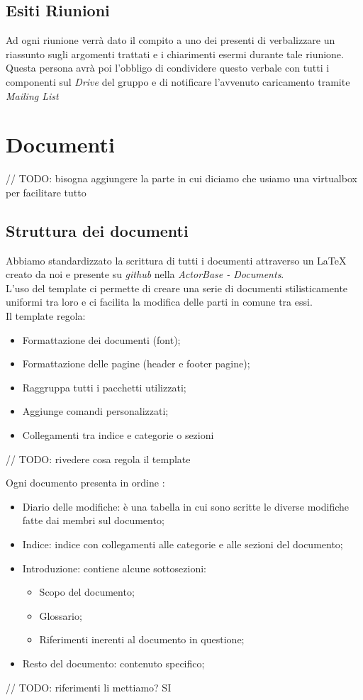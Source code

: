 \documentclass{scalatekids-article}
\begin{document}
\subsection{Esiti Riunioni}
Ad ogni riunione verrà dato il compito a uno dei presenti di verbalizzare un riassunto sugli argomenti trattati e i chiarimenti esermi durante tale riunione.\\
Questa persona avrà poi l'obbligo di condividere questo verbale con tutti i componenti sul \textit{Drive} del gruppo e di notificare l'avvenuto caricamento tramite \textit{Mailing List}

\section{Documenti}
// TODO: bisogna aggiungere la parte in cui diciamo che usiamo una virtualbox per facilitare tutto

\subsection{Struttura dei documenti}
Abbiamo standardizzato la scrittura di tutti i documenti attraverso un  \LaTeX\xspace creato da noi e presente su \textit{github} nella  \textit{ActorBase - Documents}.\\
L'uso del template ci permette di creare una serie di documenti stilisticamente uniformi tra loro e ci facilita la modifica delle parti in comune tra essi.\\
Il template regola:
\begin{itemize}
\item Formattazione dei documenti (font);
\item Formattazione delle pagine (header e footer pagine);
\item Raggruppa tutti i pacchetti utilizzati;
\item Aggiunge comandi personalizzati;
\item Collegamenti tra indice e categorie o sezioni
\end{itemize}
// TODO: rivedere cosa regola il template

Ogni documento presenta in ordine :
\begin{itemize}
\item Diario delle modifiche: è una tabella in cui sono scritte le diverse modifiche fatte dai membri sul documento;
\item Indice: indice con collegamenti alle categorie e alle sezioni del documento;
\item Introduzione: contiene alcune sottosezioni:
  \begin{itemize}
  \item Scopo del documento;
  \item Glossario;
  \item Riferimenti inerenti al documento in questione;
  \end{itemize}
\item Resto del documento: contenuto specifico;
\end{itemize}
// TODO: riferimenti li mettiamo? SI
\end{document}
